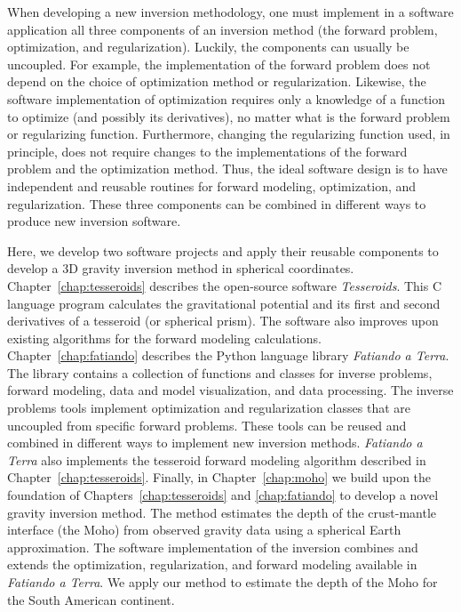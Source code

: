 When developing a new inversion methodology, one must implement in a software
application all three components of an inversion method (the forward problem,
optimization, and regularization).
Luckily, the components can usually be uncoupled.
For example, the implementation of the forward problem does not depend on the
choice of optimization method or regularization.
Likewise, the software implementation of optimization requires only a knowledge
of a function to optimize (and possibly its derivatives), no matter what is the
forward problem or regularizing function.
Furthermore, changing the regularizing function used, in principle, does not
require changes to the implementations of the forward problem and the
optimization method.
Thus, the ideal software design is to have independent and reusable routines
for forward modeling, optimization, and regularization.
These three components can be combined in different ways to produce
new inversion software.

Here, we develop two software projects and apply their reusable components to
develop a 3D gravity inversion method in spherical coordinates.
Chapter~\ref{chap:tesseroids} describes the open-source software
\textit{Tesseroids}.
This C language program calculates the gravitational potential and its first
and second derivatives of a tesseroid (or spherical prism).
The software also improves upon existing algorithms for the forward modeling
calculations.
Chapter~\ref{chap:fatiando} describes the Python language library
\textit{Fatiando a Terra}.
The library contains a collection of functions and classes for inverse
problems, forward modeling, data and model visualization, and data processing.
The inverse problems tools implement optimization and regularization classes
that are uncoupled from specific forward problems.
These tools can be reused and combined in different ways to implement new
inversion methods.
\textit{Fatiando a Terra} also implements the tesseroid forward modeling
algorithm described in Chapter~\ref{chap:tesseroids}.
Finally, in Chapter~\ref{chap:moho} we build upon the foundation of
Chapters~\ref{chap:tesseroids} and \ref{chap:fatiando} to develop a novel
gravity inversion method.
The method estimates the depth of the crust-mantle interface (the Moho) from
observed gravity data using a spherical Earth approximation.
The software implementation of the inversion combines and extends the
optimization, regularization, and forward modeling available in
\textit{Fatiando a Terra}.
We apply our method to estimate the depth of the Moho for the South American
continent.
